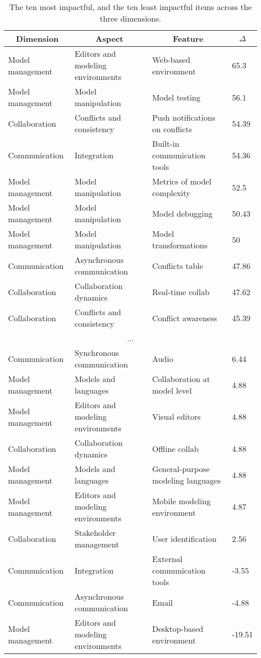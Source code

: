 
  \begin{table*}[]
  \centering
  \notsotiny
  \caption{ The ten most impactful, and the ten least impactful items across the three dimensions.}
\label{tab:top-bottom-delta}
\begin{tabular}{@{}llll@{}}
  \toprule
\multicolumn{1}{c}{\textbf{Dimension}} & \multicolumn{1}{c}{\textbf{Aspect}} & \multicolumn{1}{c}{\textbf{Feature}} & \multicolumn{1}{c}{\textbf{$\Delta$}} \\ 

  \midrule
  Model management & Editors and modeling environments & Web-based environment & 65.3 \\ 
Model management & Model manipulation & Model testing & 56.1 \\ 
Collaboration & Conflicts and consistency & Push notifications on conflicts & 54.39 \\ 
Communication & Integration & Built-in communication tools & 54.36 \\ 
Model management & Model manipulation & Metrics of model complexity & 52.5 \\ 
Model management & Model manipulation & Model debugging & 50.43 \\ 
Model management & Model manipulation & Model transformations & 50 \\ 
Communication & Asynchronous communication & Conflicts table & 47.86 \\ 
Collaboration & Collaboration dynamics & Real-time collab & 47.62 \\ 
Collaboration & Conflicts and consistency & Conflict awareness & 45.39 \\ 
\multicolumn{4}{c}{...} \\ 
Communication & Synchronous communication & Audio & 6.44 \\ 
Model management & Models and languages & Collaboration at model level & 4.88 \\ 
Model management & Editors and modeling environments & Visual editors & 4.88 \\ 
Collaboration & Collaboration dynamics & Offline collab & 4.88 \\ 
Model management & Models and languages & General-purpose modeling languages & 4.88 \\ 
Model management & Editors and modeling environments & Mobile modeling environment & 4.87 \\ 
Collaboration & Stakeholder management & User identification & 2.56 \\ 
Communication & Integration & External communication tools & -3.55 \\ 
Communication & Asynchronous communication & Email & -4.88 \\ 
Model management & Editors and modeling environments & Desktop-based environment & -19.51 \\ 
\bottomrule
  \end{tabular}%
  \end{table*}